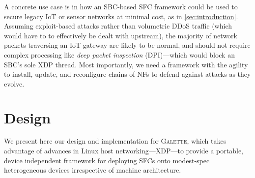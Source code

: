 \documentclass[comsoc, conference, times]{IEEEtran}
\newcommand{\ourtech}{\textsc{Galette}}
\begin{document}
A concrete use case is in how an SBC-based SFC framework could be used to secure legacy IoT or sensor networks at minimal cost, as in \cref{sec:introduction}.
Assuming exploit-based attacks rather than volumetric DDoS traffic (which would have to to effectively be dealt with upstream), the majority of network packets traversing an IoT gateway are likely to be normal, and should not require complex processing like \emph{deep packet inspection} (DPI)---which would block an SBC's sole XDP thread.
Most importantly, we need a framework with the agility to install, update, and reconfigure chains of NFs to defend against attacks as they evolve.





\section{Design}\label{sec:design}

We present here our design and implementation for \ourtech{}, which takes advantage of advances in Linux host networking---XDP---to provide a portable, device independent framework for deploying SFCs onto modest-spec heterogeneous devices irrespective of machine architecture.
\end{document}
